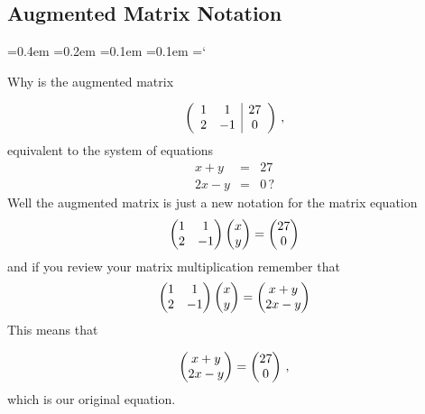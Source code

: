 \subsection*{Augmented Matrix Notation}

{\ttfamily
{}\font=0.4em
\font=0.2em
\font=0.1em
\font=0.1em
\hyphenchar\font=`\-


\hypertarget{script_gaussian_elimination_more}{Why is the augmented  matrix} 
\[ \left( \begin{array}{cc | c}
1 & 1 & 27 \\
2 & -1 & 0  
\end{array} \right)\, ,
\]
equivalent to the system of equations
\begin{eqnarray*}
 x+y &=& 27\\
 2x - y &=& 0\, ?
\end{eqnarray*}
Well the augmented matrix is just a new notation for the matrix equation
\begin{equation*}
    \begin{pmatrix}
      1             &1  \\
      2             &-1
    \end{pmatrix}
  \begin{pmatrix} x \\ y \end{pmatrix}
  =
  \begin{pmatrix} 27 \\ 0 \end{pmatrix}
\end{equation*}
and if you review your matrix multiplication remember that 
\begin{equation*}
    \begin{pmatrix}
      1             &1  \\
      2             &-1
    \end{pmatrix}
  \begin{pmatrix} x \\ y \end{pmatrix}
  =
  \begin{pmatrix} x+ y \\ 2x - y \end{pmatrix}
\end{equation*}
This means that

\begin{equation*}
  \begin{pmatrix} x+ y \\ 2x - y \end{pmatrix}
  =
  \begin{pmatrix} 27 \\ 0 \end{pmatrix}\, ,
\end{equation*}
which is our original equation.

}

